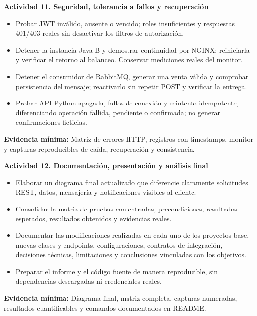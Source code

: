\documentclass[11pt,a4paper]{article}
\renewcommand{\_}{\oldunderscore\allowbreak}
\begin{document}
\vspace{0.2cm}

\noindent\textbf{Actividad 11. Seguridad, tolerancia a fallos y recuperación}
\begin{itemize}[leftmargin=*,itemsep=2pt,topsep=2pt]
  \item Probar JWT inválido, ausente o vencido; roles insuficientes y respuestas 401/403 reales sin desactivar los filtros de autorización.
  \item Detener la instancia Java B y demostrar continuidad por NGINX; reiniciarla y verificar el retorno al balanceo. Conservar mediciones reales del monitor.
  \item Detener el consumidor de RabbitMQ, generar una venta válida y comprobar persistencia del mensaje; reactivarlo sin repetir POST y verificar la entrega.
  \item Probar API Python apagada, fallos de conexión y reintento idempotente, diferenciando operación fallida, pendiente o confirmada; no generar confirmaciones ficticias.
\end{itemize}
\textbf{Evidencia mínima:} Matriz de errores HTTP, registros con timestamps, monitor y capturas reproducibles de caída, recuperación y consistencia.

\vspace{0.2cm}

\noindent\textbf{Actividad 12. Documentación, presentación y análisis final}
\begin{itemize}[leftmargin=*,itemsep=2pt,topsep=2pt]
  \item Elaborar un diagrama final actualizado que diferencie claramente solicitudes REST, datos, mensajería y notificaciones visibles al cliente.
  \item Consolidar la matriz de pruebas con entradas, precondiciones, resultados esperados, resultados obtenidos y evidencias reales.
  \item Documentar las modificaciones realizadas en cada uno de los proyectos base, nuevas clases y endpoints, configuraciones, contratos de integración, decisiones técnicas, limitaciones y conclusiones vinculadas con los objetivos.
  \item Preparar el informe y el código fuente de manera reproducible, sin dependencias descargadas ni credenciales reales.
\end{itemize}
\textbf{Evidencia mínima:} Diagrama final, matriz completa, capturas numeradas, resultados cuantificables y comandos documentados en README.
\end{document}
